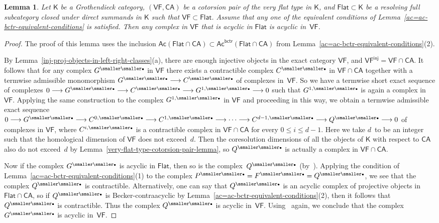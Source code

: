 \documentclass[12pt,a4paper]{amsart}
\newcommand{\+}{\nobreakdash-}
\renewcommand{\:}{\colon}
\newcommand{\rarrow}{\longrightarrow}
\newcommand{\bu}{{\text{\smaller\smaller$\scriptstyle\bullet$}}}
\newcommand{\sK}{\mathsf K}
\newcommand{\VF}{\mathsf{VF}}
\newcommand{\CA}{\mathsf{CA}}
\newcommand{\Flat}{\mathsf{Flat}}
\newcommand{\Ac}{\mathsf{Ac}}
\newcommand{\inj}{\mathsf{inj}}
\newcommand{\bctr}{\mathsf{bctr}}
\theoremstyle{plain}
\newtheorem{lem}[thm]{Lemma}
\theoremstyle{definition}
\begin{document}
\begin{lem} \label{flat-veryflat-periodicity}
 Let\/ $\sK$ be a Grothendieck category, $(\VF,\CA)$ be a cotorsion pair
of the very flat type in\/ $\sK$, and\/ $\Flat\subset\sK$ be a resolving
full subcategory closed under direct summands in\/ $\sK$ such that\/
$\VF\subset\Flat$.
 Assume that any one of the equivalent conditions of
Lemma~\ref{ac=ac-bctr-equivalent-conditions} is satisfied.
 Then any complex in\/ $\VF$ that is acyclic in\/ $\Flat$ is
acyclic in\/~$\VF$.
\end{lem}

\begin{proof}
 The proof of this lemma uses the inclusion
$\Ac(\Flat\cap\CA)\subset\Ac^\bctr(\Flat\cap\CA)$ from
Lemma~\ref{ac=ac-bctr-equivalent-conditions}(2).

 By Lemma~\ref{inj-proj-objects-in-left-right-classes}(a),
there are enough injective objects in the exact category $\VF$,
and $\VF^\inj=\VF\cap\CA$.
 It follows that for any complex $G^\bu$ in $\VF$ there exists
a contractible complex $C^\bu$ in $\VF\cap\CA$ together with
a termwise admissible monomorphism $G^\bu\rarrow C^\bu$ of
complexes in~$\VF$.
 So we have a termwise short exact sequence of complexes
$0\rarrow G^\bu\rarrow C^\bu\rarrow G^{1,\bu}\rarrow0$
such that $G^{1,\bu}$ is again a complex in~$\VF$.
 Applying the same construction to the complex $G^{1,\bu}$ in $\VF$
and proceeding in this way, we obtain a termwise admissible exact
sequence $0\rarrow G^\bu\rarrow C^{0,\bu}\rarrow C^{1,\bu}
\rarrow\dotsb\rarrow C^{d-1,\bu}\rarrow Q^\bu\rarrow0$ of complexes
in $\VF$, where $C^{i,\bu}$ is a contractible complex in $\VF\cap\CA$
for every $0\le i\le d-1$.
 Here we take $d$~to be an integer such that the homological dimension
of $\VF$ does not exceed~$d$.
 Then the coresolution dimensions of all the objects of $\sK$ with
respect to $\CA$ also do not exceed~$d$ by
Lemma~\ref{very-flat-type-cotorsion-pair-lemma}, so $Q^\bu$ is
actually a complex in $\VF\cap\CA$.

 Now if the complex $G^\bu$ is acyclic in $\Flat$, then so is
the complex~$Q^\bu$ (by~\cite[Corollary~3.6 and the dual version
of Proposition~7.6]{Bueh}).
 Applying the condition of
Lemma~\ref{ac=ac-bctr-equivalent-conditions}(1) to the complex
$P^\bu=F^\bu=Q^\bu$, we see that the complex $Q^\bu$ is contractible.
 Alternatively, one can say that $Q^\bu$ is an acyclic complex of
projective objects in $\Flat\cap\CA$, so if $Q^\bu$ is
Becker-contraacyclic by
Lemma~\ref{ac=ac-bctr-equivalent-conditions}(2), then it follows
that $Q^\bu$ is contractible.
 Thus the complex $Q^\bu$ is acyclic in~$\VF$.
 Using~\cite[Corollary~3.6]{Bueh} again, we conclude that
the complex $G^\bu$ is acyclic in~$\VF$.
\end{proof}
\end{document}
